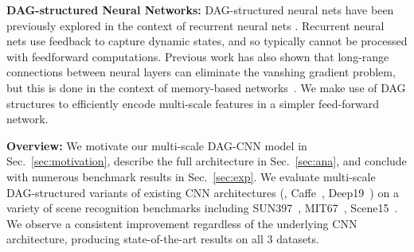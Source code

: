 \documentclass[10pt,twocolumn,letterpaper]{article}
\begin{document}

{\bf DAG-structured Neural Networks:} DAG-structured neural nets have been previously explored in the context of recurrent neural nets \cite{baldi2003principled,graves2009offline}. Recurrent neural nets use feedback to capture dynamic states, and so typically cannot be processed with feedforward computations. Previous work has also shown that long-range connections between neural layers can eliminate the vanshing gradient problem, but this is done in the context of memory-based networks~\cite{hochreiter1997long}. We make use of DAG structures to efficiently encode multi-scale features in a simpler feed-forward network.

{\bf Overview:} We motivate our multi-scale DAG-CNN model in Sec.~\ref{sec:motivation}, describe the full architecture in Sec.~\ref{sec:ana}, and conclude with numerous benchmark results in Sec.~\ref{sec:exp}. We evaluate multi-scale DAG-structured variants of existing CNN architectures (\eg, Caffe~\cite{Caffe}, Deep19~\cite{veryDeep}) on a variety of scene recognition benchmarks including SUN397~\cite{SUN397}, MIT67~\cite{MIT67}, Scene15~\cite{Scene15}. We observe a consistent improvement regardless of the underlying CNN architecture, producing state-of-the-art results on all 3 datasets.
\end{document}
